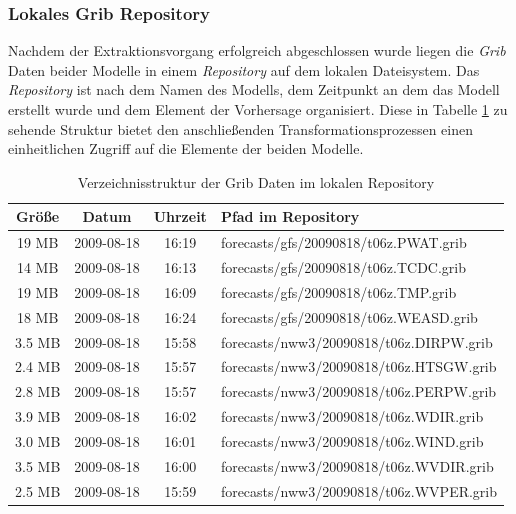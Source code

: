 \subsubsection{Lokales Grib Repository}
Nachdem der Extraktionsvorgang erfolgreich abgeschlossen wurde liegen
die \textit{Grib} Daten beider Modelle in einem \textit{Repository}
auf dem lokalen Dateisystem. Das \textit{Repository} ist nach dem
Namen des Modells, dem Zeitpunkt an dem das Modell erstellt wurde und
dem Element der Vorhersage organisiert. Diese in Tabelle
\ref{tab:repository} zu sehende Struktur bietet den anschließenden
Transformationsprozessen einen einheitlichen Zugriff auf die Elemente
der beiden Modelle.

\begin{table}
  \centering
  {\sf
    \footnotesize
    \begin{longtable}{@{}cccl}
      \toprule
      \textbf{Größe} & \textbf{Datum} & \textbf{Uhrzeit} & \textbf{Pfad im Repository} \\
      \midrule
      19 MB & 2009-08-18 & 16:19 & forecasts/gfs/20090818/t06z.PWAT.grib \\
      14 MB & 2009-08-18 & 16:13 & forecasts/gfs/20090818/t06z.TCDC.grib \\
      19 MB & 2009-08-18 & 16:09 & forecasts/gfs/20090818/t06z.TMP.grib \\
      18 MB & 2009-08-18 & 16:24 & forecasts/gfs/20090818/t06z.WEASD.grib \\
      \midrule
      3.5 MB & 2009-08-18 & 15:58 & forecasts/nww3/20090818/t06z.DIRPW.grib \\
      2.4 MB & 2009-08-18 & 15:57 & forecasts/nww3/20090818/t06z.HTSGW.grib \\
      2.8 MB & 2009-08-18 & 15:57 & forecasts/nww3/20090818/t06z.PERPW.grib \\
      3.9 MB & 2009-08-18 & 16:02 & forecasts/nww3/20090818/t06z.WDIR.grib \\
      3.0 MB & 2009-08-18 & 16:01 & forecasts/nww3/20090818/t06z.WIND.grib \\
      3.5 MB & 2009-08-18 & 16:00 & forecasts/nww3/20090818/t06z.WVDIR.grib \\
      2.5 MB & 2009-08-18 & 15:59 & forecasts/nww3/20090818/t06z.WVPER.grib \\
      \bottomrule
    \end{longtable}
  }
  \caption{Verzeichnisstruktur der Grib Daten im lokalen Repository}
  \label{tab:repository}
\end{table}

